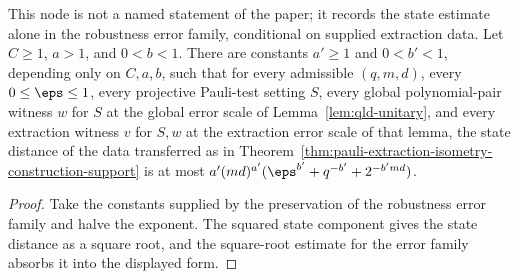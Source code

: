 \begin{example}
  \label{lem:pauli-extraction-state-error-form-support}
  \leanok
  This node is not a named statement of the paper; it records the state
  estimate alone in the robustness error family, conditional on supplied
  extraction data. Let $C\geq1$, $a>1$, and $0<b<1$. There are constants
  $a'\geq1$ and $0<b'<1$, depending only on $C,a,b$, such that for every
  admissible $(q,m,d)$, every $0\leq\eps\leq1$, every projective Pauli-test
  setting $S$, every global polynomial-pair witness $w$ for $S$ at the global
  error scale of Lemma~\ref{lem:qld-unitary}, and every extraction witness $v$
  for $S,w$ at the extraction error scale of that lemma, the state distance of
  the data transferred as in
  Theorem~\ref{thm:pauli-extraction-isometry-construction-support} is at most
  $a'(md)^{a'}(\eps^{b'}+q^{-b'}+2^{-b'md})$.
\end{example}
\begin{proof}
  \leanok
  Take the constants supplied by the preservation of the robustness error
  family and halve the exponent. The squared state component gives the state
  distance as a square root, and the square-root estimate for the error family
  absorbs it into the displayed form.
\end{proof}

